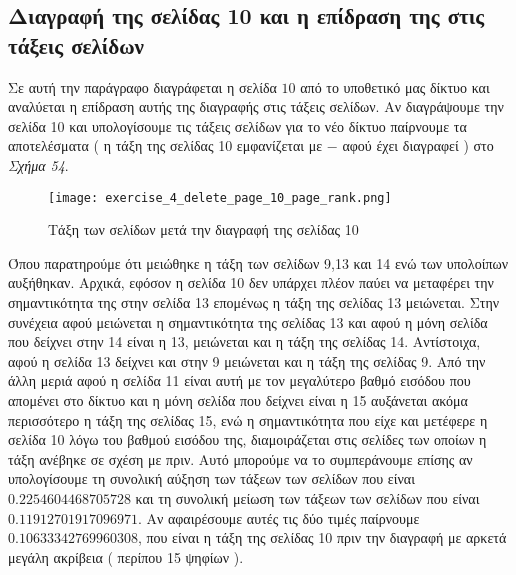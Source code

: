 \documentclass[First Project.tex]{subfiles}
\begin{document}
\subsection{ Διαγραφή της σελίδας 10 και η επίδραση της στις τάξεις σελίδων  }

Σε αυτή την παράγραφο διαγράφεται η σελίδα $10$ από το υποθετικό μας δίκτυο και αναλύεται η επίδραση αυτής της 
διαγραφής στις τάξεις σελίδων. Αν διαγράψουμε την σελίδα 10 και υπολογίσουμε τις τάξεις σελίδων για το νέο 
δίκτυο παίρνουμε τα αποτελέσματα ( η τάξη της σελίδας 10 εμφανίζεται με $-$ αφού έχει διαγραφεί ) στο 
\textit{Σχήμα 54}.

\begin{figure}[h!]
    \centering
    \captionsetup{justification=centering}
    \begin{center}
        \texttt{[image: exercise\_4\_delete\_page\_10\_page\_rank.png]}    
        \caption{ Τάξη των σελίδων μετά την διαγραφή της σελίδας 10 }
    \end{center}
\end{figure} 

\vspace{10mm}
Όπου παρατηρούμε ότι μειώθηκε η τάξη των σελίδων 9,13 και 14 ενώ των υπολοίπων αυξήθηκαν. Αρχικά, εφόσον η σελίδα
10 δεν υπάρχει πλέον παύει να μεταφέρει την σημαντικότητα της στην σελίδα 13 επομένως η τάξη της σελίδας 13
μειώνεται. Στην συνέχεια αφού μειώνεται η σημαντικότητα της σελίδας 13 και αφού η μόνη σελίδα που δείχνει στην 14 είναι
η 13, μειώνεται και η τάξη της σελίδας 14. Αντίστοιχα, αφού η σελίδα 13 δείχνει και στην 9 μειώνεται και η τάξη της 
σελίδας 9. Από την άλλη μεριά αφού η σελίδα 11 είναι αυτή με τον μεγαλύτερο βαθμό εισόδου που απομένει στο δίκτυο και η
μόνη σελίδα που δείχνει είναι η 15 αυξάνεται ακόμα περισσότερο η τάξη της σελίδας 15, ενώ η σημαντικότητα που είχε και
μετέφερε η σελίδα 10 λόγω του βαθμού εισόδου της, διαμοιράζεται στις σελίδες των οποίων η τάξη ανέβηκε σε σχέση με πριν.
Αυτό μπορούμε να το συμπεράνουμε επίσης αν υπολογίσουμε τη συνολική αύξηση των τάξεων των σελίδων που είναι
$0.2254604468705728$ και τη συνολική μείωση των τάξεων των σελίδων που είναι $0.11912701917096971$. Αν αφαιρέσουμε αυτές
τις δύο τιμές παίρνουμε $0.10633342769960308$, που είναι η τάξη της σελίδας 10 πριν την διαγραφή με αρκετά μεγάλη
ακρίβεια ( περίπου 15 ψηφίων ).
\end{document}
